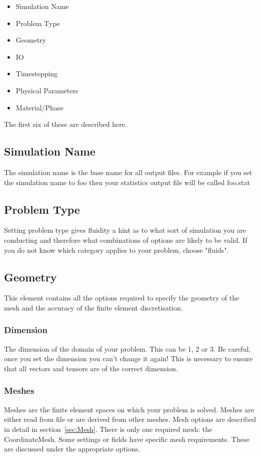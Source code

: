 \begin{itemize}
\item Simulation Name
\item Problem Type
\item Geometry
\item IO
\item Timestepping
\item Physical Parameters
\item Material/Phase
\end{itemize}

The first six of these are described here.

\subsection{Simulation Name}
The simulation name is the base name for all output files. For example if you set the simulation name to foo then your statistics output file will be called foo.stat

\subsection{Problem Type}
Setting problem type gives fluidity a hint as to what sort of simulation you are conducting and therefore what combinations of options are likely to be valid. If you do not know which category applies to your problem, choose "fluids". 
\subsection{Geometry}
This element contains all the options required to specify the geometry of the mesh and the accuracy of the finite element discretisation.

\subsubsection{Dimension}
The dimension of the domain of your problem. This can be 1, 2 or 3.
Be careful, once you set the dimension you can't change it again!
This is necessary to ensure that all vectors and tensors are of the correct
dimension.

\subsubsection{Meshes} \label{sec:mesh_configuration}
Meshes are the finite element spaces on which your problem is solved. Meshes
are either read from file or are derived from other meshes. Mesh options are
described in detail in section~\ref{sec:Mesh}.  There is only one required
mesh: the CoordinateMesh. Some settings or fields have
specific mesh requirements. These are discussed under the appropriate
options.

